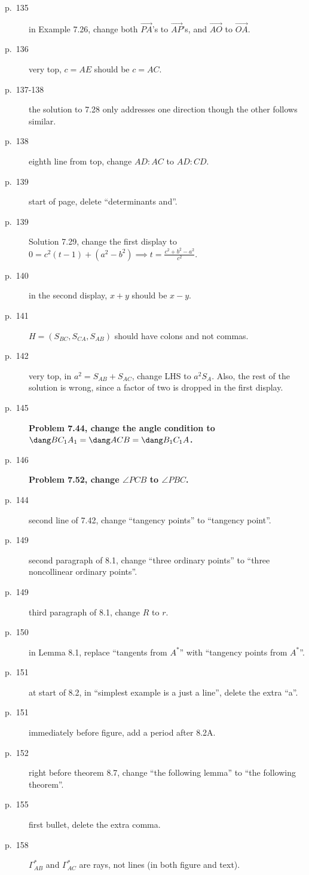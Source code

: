 \documentclass[11pt]{scrartcl}
\newcommand{\crucial}[1]{\textbf{\sffamily\large\color{red} #1}}
\begin{document}
\begin{description}
\item[p.\  135] in Example 7.26, change both $\overrightarrow{PA}$'s to $\overrightarrow{AP}$'s, and $\overrightarrow{AO}$ to $\overrightarrow{OA}$.
\item[p.\  136] very top, $c=AE$ should be $c=AC$.
\item[p.\  137-138] the solution to 7.28 only addresses one direction
  though the other follows similar.
\item[p.\  138] eighth line from top, change $AD:AC$ to $AD:CD$.
\item[p.\  139] start of page, delete ``determinants and''.
\item[p.\  139] Solution 7.29, change the first display to
  $0 = c^2(t-1) + (a^2-b^2) \implies t = \frac{c^2+b^2-a^2}{c^2}$.
\item[p.\  140] in the second display, $x+y$ should be $x-y$.
\item[p.\  141] $H = (S_{BC},S_{CA},S_{AB})$ should have
  colons and not commas.
\item[p.\  142] very top, in $a^2=S_{AB}+S_{AC}$, change LHS to $a^2S_A$.
  Also, the rest of the solution is wrong, since a factor of two is dropped in the first display.
\item[p.\  145] \crucial{Problem 7.44, change the angle condition to $\dang BC_1A_1 = \dang ACB = \dang B_1C_1A$.}
\item[p.\  146] \crucial{Problem 7.52, change $\angle PCB$ to $\angle PBC$.}
\item[p.\  144] second line of 7.42, change ``tangency points'' to ``tangency point''.
\item[p.\  149] second paragraph of 8.1, change ``three ordinary points'' to ``three noncollinear ordinary points''.
\item[p.\  149] third paragraph of 8.1, change $R$ to $r$.
\item[p.\  150] in Lemma 8.1, replace ``tangents from $A^\ast$'' with ``tangency points from $A^\ast$''.
\item[p.\  151] at start of 8.2, in ``simplest example is a just a line'', delete the extra ``a''.
\item[p.\  151] immediately before figure, add a period after 8.2A.
\item[p.\  152] right before theorem 8.7, change ``the following lemma'' to ``the following theorem''.
\item[p.\  155] first bullet, delete the extra comma.
\item[p.\  158] $\Gamma_{AB}^\ast$ and $\Gamma_{AC}^\ast$ are rays, not lines (in both figure and text).

\end{description}
\end{document}
